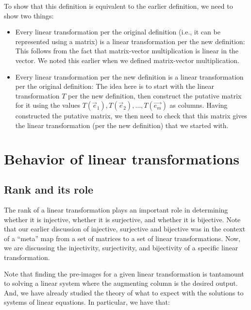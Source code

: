\documentclass[10pt]{amsart}
\begin{document}
To show that this definition is equivalent to the earlier definition, we need to show two things:

\begin{itemize}
\item Every linear transformation per the original definition (i.e.,
  it can be represented using a matrix) is a linear transformation per
  the new definition: This follows from the fact that matrix-vector
  multiplication is linear in the vector. We noted this earlier when
  we defined matrix-vector multiplication.
\item Every linear transformation per the new definition is a linear
  transformation per the original definition: The idea here is to
  start with the linear transformation $T$ per the new definition,
  then construct the putative matrix for it using the values
  $T(\vec{e}_1),T(\vec{e}_2),\dots,T(\vec{e_m})$ as columns. Having
  constructed the putative matrix, we then need to check that this
  matrix gives the linear transformation (per the new definition) that
  we started with.
\end{itemize}

\section{Behavior of linear transformations}

\subsection{Rank and its role}

The rank of a linear transformation plays an important role in
determining whether it is injective, whether it is surjective, and
whether it is bijective. Note that our earlier discussion of
injective, surjective and bijective was in the context of a ``meta''
map from a set of matrices to a set of linear transformations. Now, we
are discussing the injectivity, surjectivity, and bijectivity of a
specific linear transformation.

Note that finding the pre-images for a given linear transformation is
tantamount to solving a linear system where the augmenting column is
the desired output. And, we have already studied the theory of what to
expect with the solutions to systems of linear equations. In
particular, we have that:
\end{document}
